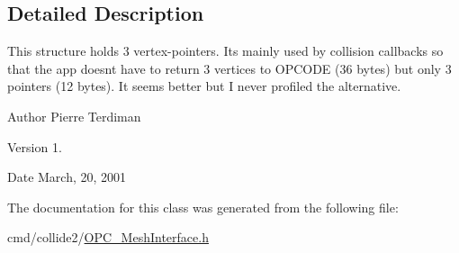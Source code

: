 \subsection{Detailed Description}
This structure holds 3 vertex-\/pointers. It\textquotesingle{}s mainly used by collision callbacks so that the app doesn\textquotesingle{}t have to return 3 vertices to O\+P\+C\+O\+DE (36 bytes) but only 3 pointers (12 bytes). It seems better but I never profiled the alternative.

\begin{DoxyAuthor}{Author}
Pierre Terdiman 
\end{DoxyAuthor}
\begin{DoxyVersion}{Version}
1. 
\end{DoxyVersion}
\begin{DoxyDate}{Date}
March, 20, 2001 
\end{DoxyDate}


The documentation for this class was generated from the following file\+:\begin{DoxyCompactItemize}
\item 
cmd/collide2/\hyperlink{OPC__MeshInterface_8h}{O\+P\+C\+\_\+\+Mesh\+Interface.\+h}\end{DoxyCompactItemize}
